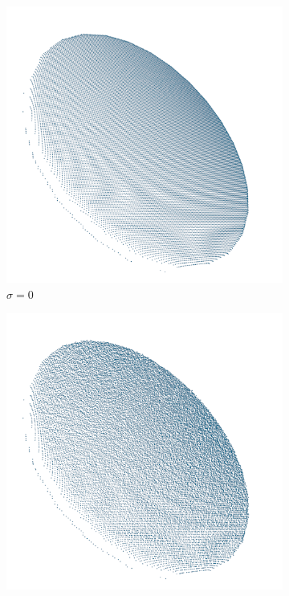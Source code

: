 \begin{figure}[!t]
	\centering
	\hfill
	\begin{subfigure}{0.32\textwidth}
		\centering
		\includegraphics[width=\linewidth]{Figures/ObjRecog/stddev_0}
		\caption{$\sigma=0$}
		\label{subfig:objrecog:noise:0}
	\end{subfigure}
	\hfill
	\begin{subfigure}{0.32\textwidth}
		\centering
		\includegraphics[width=\linewidth]{Figures/ObjRecog/stddev_01}

\end{subfigure}
\end{figure}
